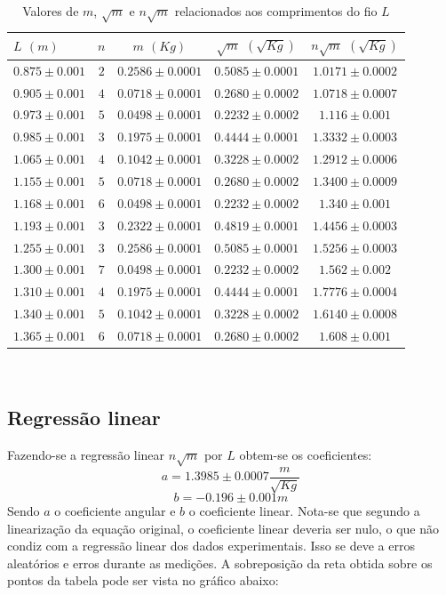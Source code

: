 \documentclass[12pt,a4paper]{article}
\begin{document}
\begin{table}[!htbp]
\centering
\def\arraystretch{1.3}
\caption{Valores de $m$, $\sqrt{m}$ e $n\sqrt{m}$ relacionados aos comprimentos do fio $L$}
\label{Resultados}
\begin{tabular}{|l|c|c|c|c|}
\hline
$L$ $(m)$ & $n$ & $m$ $(Kg)$ & $\sqrt{m}$ $(\sqrt{Kg})$ & $n\sqrt{m}$ $(\sqrt{Kg})$ \\
\hline
$0.875\pm0.001$ & $2$ & $0.2586\pm0.0001$ & $0.5085\pm0.0001$ & $1.0171\pm0.0002$ \\
\hline
$0.905\pm0.001$ & $4$ & $0.0718\pm0.0001$ & $0.2680\pm0.0002$ & $1.0718\pm0.0007$ \\
\hline
$0.973\pm0.001$ & $5$ & $0.0498\pm0.0001$ & $0.2232\pm0.0002$ & $1.116\pm0.001$ \\
\hline
$0.985\pm0.001$ & $3$ & $0.1975\pm0.0001$ & $0.4444\pm0.0001$ & $1.3332\pm0.0003$ \\
\hline
$1.065\pm0.001$ & $4$ & $0.1042\pm0.0001$ & $0.3228\pm0.0002$ & $1.2912\pm0.0006$ \\
\hline
$1.155\pm0.001$ & $5$ & $0.0718\pm0.0001$ & $0.2680\pm0.0002$ & $1.3400\pm0.0009$ \\
\hline
$1.168\pm0.001$ & $6$ & $0.0498\pm0.0001$ & $0.2232\pm0.0002$ & $1.340\pm0.001$ \\
\hline
$1.193\pm0.001$ & $3$ & $0.2322\pm0.0001$ & $0.4819\pm0.0001$ & $1.4456\pm0.0003$ \\
\hline
$1.255\pm0.001$ & $3$ & $0.2586\pm0.0001$ & $0.5085\pm0.0001$ & $1.5256\pm0.0003$ \\
\hline
$1.300\pm0.001$ & $7$ & $0.0498\pm0.0001$ & $0.2232\pm0.0002$ & $1.562\pm0.002$ \\
\hline
$1.310\pm0.001$ & $4$ & $0.1975\pm0.0001$ & $0.4444\pm0.0001$ & $1.7776\pm0.0004$ \\
\hline
$1.340\pm0.001$ & $5$ & $0.1042\pm0.0001$ & $0.3228\pm0.0002$ & $1.6140\pm0.0008$ \\
\hline
$1.365\pm0.001$ & $6$ & $0.0718\pm0.0001$ & $0.2680\pm0.0002$ & $1.608\pm0.001$ \\
\hline

\end{tabular} \\

\end{table}

\subsection{Regressão linear}
Fazendo-se a regressão linear $n\sqrt{m}$ por $L$ obtem-se os coeficientes:
$$a = 1.3985 \pm 0.0007 \dfrac{m}{\sqrt{Kg}}$$
$$b = -0.196 \pm 0.001 m$$
Sendo $a$ o coeficiente angular e $b$ o coeficiente linear.
Nota-se que segundo a linearização da equação original, o coeficiente linear deveria ser nulo, o que não condiz com a regressão linear dos dados experimentais. Isso se deve a erros aleatórios e erros durante as medições.
A sobreposição da reta obtida sobre os pontos da tabela pode ser vista no gráfico abaixo:
\end{document}
